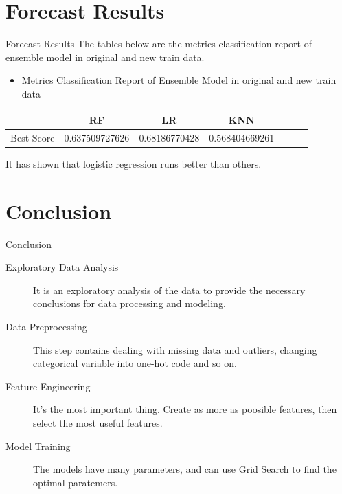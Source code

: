 \documentclass[
size=14pt,
paper=smartboard,  %
mode=present, 		%
display=slides, 	%
pauseslide,
fleqn,leqno]{powerdot}
\begin{document}
\section{Forecast Results}


\begin{slide}{Forecast Results}
The tables below are 
the metrics classification report 
of ensemble model in 
original and new train data.
\begin{itemize}
	\item Metrics Classification Report of Ensemble Model in original and new train data
\end{itemize}
\begin{center}
	\begin{tabular}{ccccccc}
	\toprule
	& RF  & LR  & KNN \\
	\midrule
	Best Score & 0.637509727626  & 0.68186770428  & 0.568404669261\\
	\bottomrule
\end{tabular}
\end{center}
It has shown that logistic regression runs better than others.

\end{slide}




\section{Conclusion}

\begin{slide}[toc=,bm=]{Conclusion}
\begin{description}
	\item[Exploratory Data Analysis] It is an 
	exploratory analysis of the data to 
	provide the necessary conclusions 
	for data processing and modeling.
	\item[Data Preprocessing] This step contains
	dealing with missing data and outliers,
	changing categorical variable 
	into one-hot code and so on.
	\item[Feature Engineering] It's the 
	most important thing.
	Create as more as poosible features,
	then select the most useful features.
	\item[Model Training] The models have 
	many parameters,
	and can use Grid Search to find 
	the optimal paratemers.	
\end{description}



\end{slide}
\end{document}
